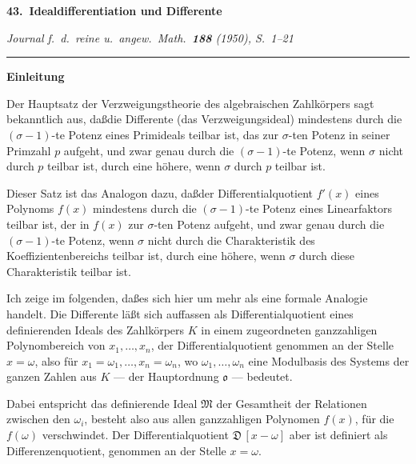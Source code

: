 \documentclass[10pt,a4paper]{article}
\theoremstyle{plain}
\theoremstyle{definition}
\theoremstyle{remark}
\newcommand{\ido}{\mathfrak{o}}
\newcommand{\idM}{\mathfrak{M}}
\newcommand{\diff}{\mathfrak{D}}
\begin{document}
\begin{center}
\Large\bfseries 43.\ Idealdifferentiation und Differente
\end{center}
\begin{center}\textit{Journal f.\ d.\ reine u.\ angew.\ Math.\ \textbf{188} (1950), S.\ 1--21}\end{center}

\medskip
\noindent\rule{\textwidth}{0.4pt}
\begin{center}\textbf{Einleitung}\end{center}

Der Hauptsatz der Verzweigungstheorie des algebraischen Zahlk\"orpers sagt bekanntlich aus, da\ss  die Differente (das Verzweigungsideal) mindestens durch die $(\sigma-1)$-te Potenz eines Primideals teilbar ist, das zur $\sigma$-ten Potenz in seiner Primzahl $p$ aufgeht, und zwar genau durch die $(\sigma-1)$-te Potenz, wenn $\sigma$ nicht durch $p$ teilbar ist, durch eine h\"ohere, wenn $\sigma$ durch $p$ teilbar ist.

Dieser Satz ist das Analogon dazu, da\ss  der Differentialquotient $f'(x)$ eines Polynoms $f(x)$ mindestens durch die $(\sigma-1)$-te Potenz eines Linearfaktors teilbar ist, der in $f(x)$ zur $\sigma$-ten Potenz aufgeht, und zwar genau durch die $(\sigma-1)$-te Potenz, wenn $\sigma$ nicht durch die Charakteristik des Koeffizientenbereichs teilbar ist, durch eine h\"ohere, wenn $\sigma$ durch diese Charakteristik teilbar ist.

Ich zeige im folgenden, da\ss  es sich hier um mehr als eine formale Analogie handelt. Die Differente l\"a\ss t sich auffassen als Differentialquotient eines definierenden Ideals des Zahlk\"orpers $K$ in einem zugeordneten ganzzahligen Polynombereich von $x_1,\ldots,x_n$, der Differentialquotient genommen an der Stelle $x=\omega$, also f\"ur $x_1=\omega_1,\ldots,x_n=\omega_n$, wo $\omega_1,\ldots,\omega_n$ eine Modulbasis des Systems der ganzen Zahlen aus $K$ --- der Hauptordnung $\ido$ --- bedeutet.

Dabei entspricht das definierende Ideal $\idM$ der Gesamtheit der Relationen zwischen den $\omega_i$, besteht also aus allen ganzzahligen Polynomen $f(x)$, f\"ur die $f(\omega)$ verschwindet. Der Differentialquotient $\diff\,[x-\omega]$ aber ist definiert als Differenzenquotient, genommen an der Stelle $x=\omega$.
\end{document}
